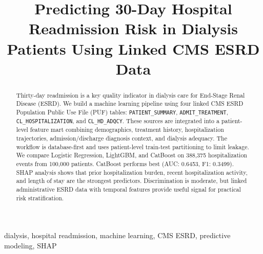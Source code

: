 \documentclass[conference]{IEEEtran}
\begin{document}
\title{Predicting 30-Day Hospital Readmission Risk in Dialysis Patients Using Linked CMS ESRD Data}

\author{
    \and
    \and
    \and
}

\maketitle

\begin{abstract}
Thirty-day readmission is a key quality indicator in dialysis care for End-Stage Renal Disease (ESRD). We build a machine learning pipeline using four linked CMS ESRD Population Public Use File (PUF) tables: 
\texttt{PATIENT\_SUMMARY}, \texttt{ADMIT\_TREATMENT}, \texttt{CL\_HOSPITALIZATION}, and \texttt{CL\_HD\_ADQCY}. These sources are integrated into a patient-level feature mart combining demographics, treatment history, hospitalization trajectories, admission/discharge diagnosis context, and dialysis adequacy. The workflow is database-first and uses patient-level train-test partitioning to limit leakage. We compare Logistic Regression, LightGBM, and CatBoost on 388,375 hospitalization events from 100,000 patients. CatBoost performs best (AUC: 0.6453, F1: 0.3499). SHAP analysis shows that prior hospitalization burden, recent hospitalization activity, and length of stay are the strongest predictors. Discrimination is moderate, but linked administrative ESRD data with temporal features provide useful signal for practical risk stratification.
\end{abstract}

\begin{IEEEkeywords}
dialysis, hospital readmission, machine learning, CMS ESRD, predictive modeling, SHAP
\end{IEEEkeywords}
\end{document}
